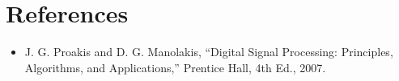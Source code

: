 \documentclass[12pt]{article}
\begin{document}
\section*{References}
\begin{itemize}
  \item J. G. Proakis and D. G. Manolakis, ``Digital Signal Processing: Principles, Algorithms, and Applications,'' Prentice Hall, 4th Ed., 2007.
\end{itemize}
\end{document}
